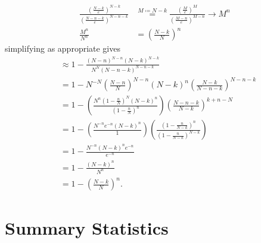 \documentclass{article}
\theoremstyle{definition}
\begin{document}
\begin{align}
    \frac{\left(\frac{N-k}{e}\right)^{N-k}}{\left(\frac{N-n-k}{e}\right)^{N-n-k}}&\stackrel{M\coloneqq N-k}{=}\frac{\left(\frac{M}{e}\right)^{M}}{\left(\frac{M-n}{e}\right)^{M-n}}\to M^{n} \nonumber\\
    \frac{M^{n}}{N^{n}}&=\left(\frac{N-k}{N}\right)^{n}\nonumber
\end{align}
simplifying as appropriate gives
\begin{align}
    & \approx 1- \frac{\left(N-n\right)^{N-n}\left(N-k\right)^{N-k}}{N^{N}\left(N-n-k\right)^{N-n-k}} \nonumber\\
    &= 1- N^{-N}\left(\frac{N-n}{N}\right)^{N-n}\left(N-k\right)^{n}\left(\frac{N-k}{N-n-k}\right)^{N-n-k} \nonumber\\
    &=1-\left(\frac{N^{n}\left(1-\frac{n}{N}\right)^{N}\left(N-k\right)^{n}}{\left(1-\frac{n}{N}\right)^{n}}\right)\left(\frac{N-n-k}{N-k}\right)^{k+n-N} \nonumber\\
    &=1-\left(\frac{N^{-n}e^{-n}\left(N-k\right)^{n}}{1}\right)\left(\frac{\left(1-\frac{n}{N-k}\right)^{n}}{\left(1-\frac{n}{N-k}\right)^{N-k}}\right) \nonumber\\
    &=1-\frac{N^{-n}\left(N-k\right)^{n}e^{-n}}{e^{-n}} \nonumber\\
    &=1-\frac{\left(N-k\right)^{n}}{N^{n}} \nonumber\\
    &=1-\left(\frac{N-k}{N}\right)^{n}.\nonumber
\end{align}

\newpage
\section{Summary Statistics}
\label {Appendix 2}
\end{document}
